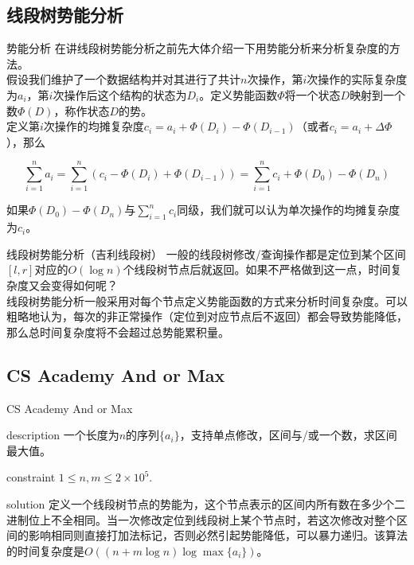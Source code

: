 \documentclass{beamer}
\begin{document}
\subsection{线段树势能分析}
\begin{frame}{势能分析}
在讲线段树势能分析之前先大体介绍一下用势能分析来分析复杂度的方法。\\

假设我们维护了一个数据结构并对其进行了共计$n$次操作，第$i$次操作的实际复杂度为$a_i$，第$i$次操作后这个结构的状态为$D_i$。定义势能函数$\Phi$将一个状态$D$映射到一个数$\Phi(D)$，称作状态$D$的势。\\

定义第$i$次操作的均摊复杂度$c_i=a_i+\Phi(D_i)-\Phi(D_{i-1})$（或者$c_i=a_i+\Delta \Phi$），那么

$$\sum_{i=1}^na_i=\sum_{i=1}^n(c_i-\Phi(D_i)+\Phi(D_{i-1}))=\sum_{i=1}^nc_i+\Phi(D_0)-\Phi(D_n)$$

如果$\Phi(D_0)-\Phi(D_n)$与$\sum\limits_{i=1}^nc_i$同级，我们就可以认为单次操作的均摊复杂度为$c_i$。

\end{frame}
\begin{frame}{线段树势能分析（吉利线段树）}
一般的线段树修改/查询操作都是定位到某个区间$[l,r]$对应的$O(\log n)$个线段树节点后就返回。如果不严格做到这一点，时间复杂度又会变得如何呢？\\

线段树势能分析一般采用对每个节点定义势能函数的方式来分析时间复杂度。可以粗略地认为，每次的非正常操作（定位到对应节点后不返回）都会导致势能降低，那么总时间复杂度将不会超过总势能累积量。

\end{frame}
\subsection{CS Academy And or Max}
\begin{frame}{CS Academy And or Max}
\begin{block}{description}
一个长度为$n$的序列$\{a_i\}$，支持单点修改，区间与/或一个数，求区间最大值。
\end{block}
\begin{block}{constraint}
$1 \le n, m \le 2\times 10^5.$
\end{block}
\pause
\begin{block}{solution}
定义一个线段树节点的势能为，这个节点表示的区间内所有数在多少个二进制位上不全相同。当一次修改定位到线段树上某个节点时，若这次修改对整个区间的影响相同则直接打加法标记，否则必然引起势能降低，可以暴力递归。该算法的时间复杂度是$O((n+m\log n)\log\max\{a_i\})$。
\end{block}
\end{frame}
\end{document}
